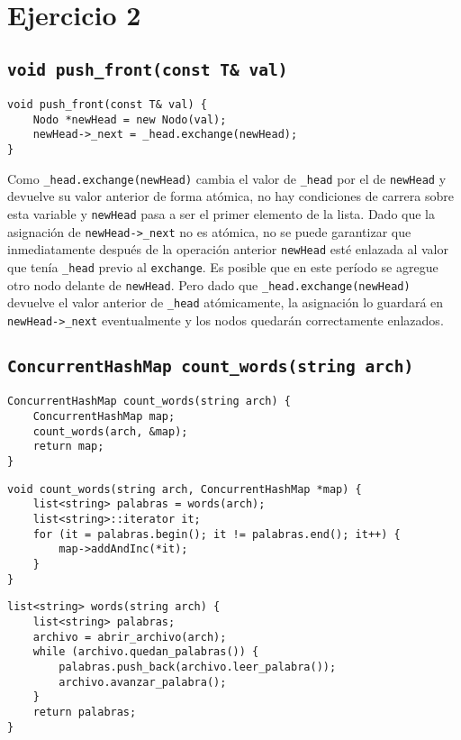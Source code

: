 \section{Ejercicio 2}


\subsection{\texttt{void push_front(const T& val)}}

\begin{verbatim}
void push_front(const T& val) {
	Nodo *newHead = new Nodo(val);
	newHead->_next = _head.exchange(newHead);
}
\end{verbatim}

Como \texttt{_head.exchange(newHead)} cambia el valor de \texttt{_head} por el de \texttt{newHead} y devuelve su valor anterior de forma atómica, no hay condiciones de carrera sobre esta variable y \texttt{newHead} pasa a ser el primer elemento de la lista. Dado que la asignación de \texttt{newHead->_next} no es atómica, no se puede garantizar que inmediatamente después de la operación anterior \texttt{newHead} esté enlazada al valor que tenía \texttt{_head} previo al \texttt{exchange}. Es posible que en este período se agregue otro nodo delante de \texttt{newHead}. Pero dado que \texttt{_head.exchange(newHead)} devuelve el valor anterior de \texttt{_head} atómicamente, la asignación lo guardará en \texttt{newHead->_next} eventualmente y los nodos quedarán correctamente enlazados.


\subsection{\texttt{ConcurrentHashMap count_words(string arch)}}

\begin{verbatim}
ConcurrentHashMap count_words(string arch) {
	ConcurrentHashMap map;
	count_words(arch, &map);
	return map;
}
\end{verbatim}

\begin{verbatim}
void count_words(string arch, ConcurrentHashMap *map) {
	list<string> palabras = words(arch);
	list<string>::iterator it;
	for (it = palabras.begin(); it != palabras.end(); it++) {
		map->addAndInc(*it);
	}
}
\end{verbatim}

\begin{verbatim}
list<string> words(string arch) {
	list<string> palabras;
	archivo = abrir_archivo(arch);
    while (archivo.quedan_palabras()) {
        palabras.push_back(archivo.leer_palabra());
        archivo.avanzar_palabra();
    }
    return palabras;
}
\end{verbatim}